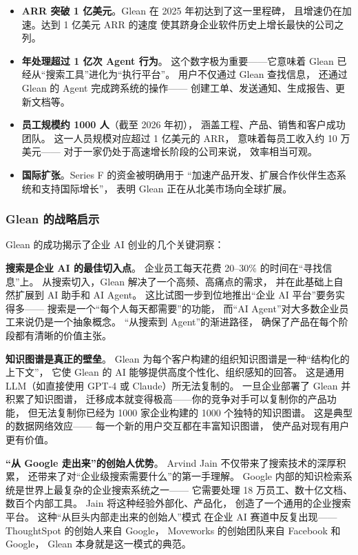 \begin{itemize}[noitemsep]
  \item \textbf{ARR 突破 1 亿美元}。Glean 在 2025 年初达到了这一里程碑，
        且增速仍在加速。达到 1 亿美元 ARR 的速度
        使其跻身企业软件历史上增长最快的公司之列。
  \item \textbf{年处理超过 1 亿次 Agent 行为}。
        这个数字极为重要——它意味着 Glean 已经从``搜索工具''进化为``执行平台''。
        用户不仅通过 Glean 查找信息，
        还通过 Glean 的 Agent 完成跨系统的操作——
        创建工单、发送通知、生成报告、更新文档等。
  \item \textbf{员工规模约 1000 人}（截至 2026 年初），
        涵盖工程、产品、销售和客户成功团队。
        这一人员规模对应超过 1 亿美元的 ARR，
        意味着每员工收入约 10 万美元——
        对于一家仍处于高速增长阶段的公司来说，
        效率相当可观。
  \item \textbf{国际扩张}。Series F 的资金被明确用于
        ``加速产品开发、扩展合作伙伴生态系统和支持国际增长''，
        表明 Glean 正在从北美市场向全球扩展。
\end{itemize}

\subsubsection{Glean 的战略启示}
Glean 的成功揭示了企业 AI 创业的几个关键洞察：

\textbf{搜索是企业 AI 的最佳切入点}。
企业员工每天花费 20--30\% 的时间在``寻找信息''上。
从搜索切入，Glean 解决了一个高频、高痛点的需求，
并在此基础上自然扩展到 AI 助手和 AI Agent。
这比试图一步到位地推出``企业 AI 平台''要务实得多——
搜索是一个``每个人每天都需要''的功能，
而``AI Agent''对大多数企业员工来说仍是一个抽象概念。
``从搜索到 Agent''的渐进路径，
确保了产品在每个阶段都有清晰的价值主张。

\textbf{知识图谱是真正的壁垒}。
Glean 为每个客户构建的组织知识图谱是一种``结构化的上下文''，
它使 Glean 的 AI 能够提供高度个性化、组织感知的回答。
这是通用 LLM（如直接使用 GPT-4 或 Claude）所无法复制的。
一旦企业部署了 Glean 并积累了知识图谱，
迁移成本就变得极高——你的竞争对手可以复制你的产品功能，
但无法复制你已经为 1000 家企业构建的 1000 个独特的知识图谱。
这是典型的数据网络效应——
每一个新的用户交互都在丰富知识图谱，
使产品对现有用户更有价值。

\textbf{``从 Google 走出来''的创始人优势}。
Arvind Jain 不仅带来了搜索技术的深厚积累，
还带来了对``企业级搜索需要什么''的第一手理解。
Google 内部的知识检索系统是世界上最复杂的企业搜索系统之一——
它需要处理 18 万员工、数十亿文档、数百个内部工具。
Jain 将这种经验外部化、产品化，
创造了一个通用的企业搜索平台。
这种``从巨头内部走出来的创始人''模式
在企业 AI 赛道中反复出现——
ThoughtSpot 的创始人来自 Google，
Moveworks 的创始团队来自 Facebook 和 Google，
Glean 本身就是这一模式的典范。

